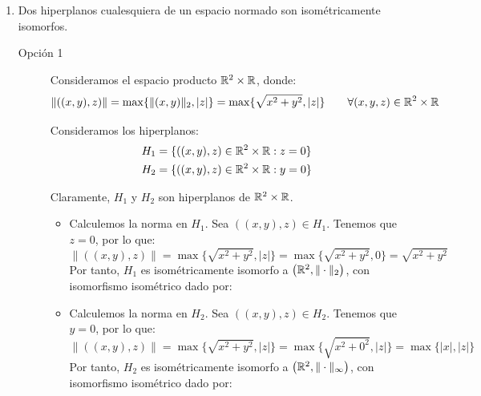 \documentclass[12pt]{article}
\begin{document}
\begin{ejercicio}
\begin{enumerate}
            Claramente, $\|e_1\| = 1$, y además:
            \begin{equation*}
                |\varphi(e_1)| = |e_1(1)| = 1
            \end{equation*}

            Por tanto, $\varphi$ alcanza su norma, y hemos encontrado un funcional lineal y continuo que alcanza su norma en un espacio normado no completo que no es el cero. Por tanto, el resultado es falso.
            \item Dos hiperplanos cualesquiera de un espacio normado son isométricamente isomorfos.
            
            \begin{description}
                \item[Opción 1] Consideramos el espacio producto $\mathbb{R}^2\times \mathbb{R}$, donde:
                \begin{equation*}
                    \|((x,y), z)\| = \max\{\|(x,y)\|_2, |z|\}= \max\{\sqrt{x^2 + y^2}, |z|\} \qquad \forall (x,y,z)\in \mathbb{R}^2\times \mathbb{R}
                \end{equation*}

                Consideramos los hiperplanos:
                \begin{align*}
                    H_1 &= \{((x,y), z)\in \mathbb{R}^2\times \mathbb{R} : z = 0\}\\
                    H_2 &= \{((x,y), z)\in \mathbb{R}^2\times \mathbb{R} : y = 0\}
                \end{align*}

                Claramente, $H_1$ y $H_2$ son hiperplanos de $\mathbb{R}^2\times \mathbb{R}$.
                \begin{itemize}
                    \item Calculemos la norma en $H_1$. Sea $((x,y), z)\in H_1$. Tenemos que $z = 0$, por lo que:
                    \begin{equation*}
                        \|((x,y), z)\| = \max\{\sqrt{x^2 + y^2}, |z|\} = \max\{\sqrt{x^2 + y^2}, 0\} = \sqrt{x^2 + y^2}
                    \end{equation*}
                    Por tanto, $H_1$ es isométricamente isomorfo a $\left(\mathbb{R}^2, \|\cdot\|_2\right)$, con isomorfismo isométrico dado por:

                    \item Calculemos la norma en $H_2$. Sea $((x,y), z)\in H_2$. Tenemos que $y = 0$, por lo que:
                    \begin{equation*}
                        \|((x,y), z)\| = \max\{\sqrt{x^2 + y^2}, |z|\} = \max\{\sqrt{x^2 + 0^2}, |z|\} = \max\{|x|, |z|\}
                    \end{equation*}
                    Por tanto, $H_2$ es isométricamente isomorfo a $\left(\mathbb{R}^2, \|\cdot\|_\infty\right)$, con isomorfismo isométrico dado por:
                \end{itemize}


\end{description}
\end{enumerate}
\end{ejercicio}
\end{document}
